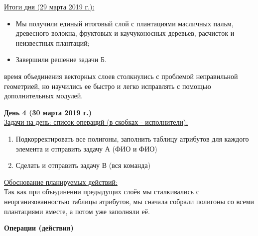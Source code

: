 \underline{Итоги дня (29 марта 2019 г.):}\\

\begin{itemize}
   \item Мы получили единый итоговый слой с плантациями масличных пальм, древесного волокна, фруктовых и каучуконосных деревьев, расчисток и неизвестных плантаций;
   \item Завершили решение задачи Б.
\end{itemize}

 время объединения векторных слоев столкнулись с проблемой неправильной геометрией, но научились ее быстро и легко исправлять с помощью дополнительных модулей.
   
\noindent\textbf{День 4 (30 марта 2019 г.)}\\

\noindent\underline{Задачи на день: список операций (в скобках - исполнители):}
   
\begin{enumerate}
   \item Подкорректировать все полигоны, заполнить таблицу атрибутов для каждого элемента и отправить задачу А (ФИО и ФИО)
   \item Сделать и отправить задачу В (вся команда)
\end{enumerate}

\noindent\underline{Обоснование планируемых действий:}\\
Так как при объединении предыдущих слоёв мы сталкивались с неорганизованностью таблицы атрибутов,  мы сначала собрали полигоны со всеми плантациями вместе, а потом уже заполняли её.

\textbf{Операции (действия)}

